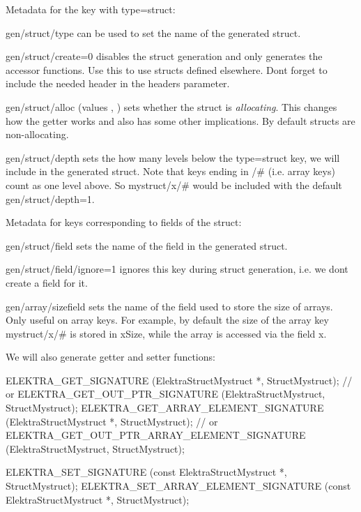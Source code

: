 \begin{DoxyItemize}
\item Metadata for the key with {\ttfamily type=struct}\+:
\begin{DoxyItemize}
\item {\ttfamily gen/struct/type} can be used to set the name of the generated struct.
\item {\ttfamily gen/struct/create=0} disables the struct generation and only generates the accessor functions. Use this to use structs defined elsewhere. Don\textquotesingle{}t forget to include the needed header in the {\ttfamily headers} parameter.
\item {\ttfamily gen/struct/alloc} (values {}, {}) sets whether the struct is {\itshape allocating}. This changes how the getter works and also has some other implications. By default structs are non-\/allocating.
\item {\ttfamily gen/struct/depth} sets the how many levels below the {\ttfamily type=struct} key, we will include in the generated struct. Note that keys ending in {\ttfamily /\#} (i.\+e. array keys) count as one level above. So {\ttfamily mystruct/x/\#} would be included with the default {\ttfamily gen/struct/depth=1}.
\end{DoxyItemize}
\item Metadata for keys corresponding to fields of the struct\+:
\begin{DoxyItemize}
\item {\ttfamily gen/struct/field} sets the name of the field in the generated struct.
\item {\ttfamily gen/struct/field/ignore=1} ignores this key during struct generation, i.\+e. we don\textquotesingle{}t create a field for it.
\item {\ttfamily gen/array/sizefield} sets the name of the field used to store the size of arrays. Only useful on array keys. For example, by default the size of the array key {\ttfamily mystruct/x/\#} is stored in {\ttfamily x\+Size}, while the array is accessed via the field {\ttfamily x}.
\end{DoxyItemize}
\end{DoxyItemize}

We will also generate getter and setter functions\+:


\begin{DoxyCode}
ELEKTRA\_GET\_SIGNATURE (ElektraStructMystruct *, StructMystruct);
\textcolor{comment}{// or ELEKTRA\_GET\_OUT\_PTR\_SIGNATURE (ElektraStructMystruct, StructMystruct);}
ELEKTRA\_GET\_ARRAY\_ELEMENT\_SIGNATURE (ElektraStructMystruct *, StructMystruct);
\textcolor{comment}{// or ELEKTRA\_GET\_OUT\_PTR\_ARRAY\_ELEMENT\_SIGNATURE (ElektraStructMystruct, StructMystruct);}

ELEKTRA\_SET\_SIGNATURE (\textcolor{keyword}{const} ElektraStructMystruct *, StructMystruct);
ELEKTRA\_SET\_ARRAY\_ELEMENT\_SIGNATURE (\textcolor{keyword}{const} ElektraStructMystruct *, StructMystruct);
\end{DoxyCode}


